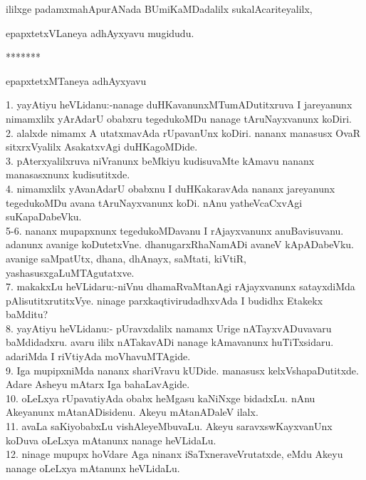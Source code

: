 \documentclass{article}
\begin{document}
\begin{center}
ililxge padamxmahApurANada BUmiKaMDadalilx sukalAcariteyalilx,
\end{center}

\begin{center}
epapxtetxVLaneya adhAyxyavu mugidudu.
\end{center}

\begin{center}
*******
\end{center}

\begin{center}
epapxtetxMTaneya adhAyxyavu
\end{center}

1. yayAtiyu heVLidanu:-nanage duHKavanunxMTumADutitxruva I jareyanunx nimamxlilx yArAdarU obabxru tegedukoMDu nanage tAruNayxvanunx koDiri.\\
2. alalxde nimamx A utatxmavAda rUpavanUnx koDiri. nananx manasusx OvaR sitxrxVyalilx AsakatxvAgi duHKagoMDide.\\
3. pAterxyalilxruva niVranunx beMkiyu kudisuvaMte kAmavu nananx manasasxnunx kudisutitxde.\\
4. nimamxlilx yAvanAdarU obabxnu I duHKakaravAda nananx jareyanunx tegedukoMDu avana tAruNayxvanunx koDi. nAnu yatheVcaCxvAgi suKapaDabeVku.\\
5-6. nananx mupapxnunx tegedukoMDavanu I rAjayxvanunx anuBavisuvanu. adanunx avanige koDutetxVne. dhanugarxRhaNamADi avaneV kApADabeVku. avanige saMpatUtx, dhana, dhAnayx, saMtati, kiVtiR, yashasusxgaLuMTAgutatxve.\\
7. makakxLu heVLidaru:-niVnu dhamaRvaMtanAgi rAjayxvanunx satayxdiMda pAlisutitxrutitxVye. ninage parxkaqtivirudadhxvAda I budidhx Etakekx baMditu?\\
8. yayAtiyu heVLidanu:- pUravxdalilx namamx Urige nATayxvADuvavaru baMdidadxru. avaru ililx nATakavADi nanage kAmavanunx huTiTxsidaru. adariMda I riVtiyAda moVhavuMTAgide.\\
9. Iga mupipxniMda nananx shariVravu kUDide. manasusx kelxVshapaDutitxde. Adare Asheyu mAtarx Iga bahaLavAgide.\\
10. oLeLxya rUpavatiyAda obabx heMgasu kaNiNxge bidadxLu. nAnu Akeyanunx mAtanADisidenu. Akeyu mAtanADaleV ilalx.\\
11. avaLa saKiyobabxLu vishAleyeMbuvaLu. Akeyu saravxswKayxvanUnx koDuva oLeLxya mAtanunx nanage heVLidaLu.\\
12. ninage mupupx hoVdare Aga ninanx iSaTxneraveVrutatxde, eMdu Akeyu nanage oLeLxya mAtanunx heVLidaLu.\\
\end{document}

